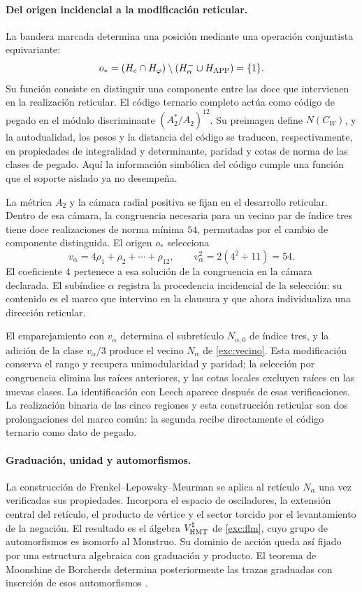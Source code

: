 \paragraph{Del origen incidencial a la modificación reticular.}
\label{inc-ampl-reticulo}
La bandera marcada determina una posición mediante una operación
conjuntista equivariante:
\[
 o_*=(H_e\cap H_\varphi)
       \setminus(H^-_\alpha\cup H_{\rm APP})=\{1\}.
\]
Su función consiste en distinguir una componente entre las doce que
intervienen en la realización reticular. El código ternario completo
actúa como código de pegado en el módulo discriminante
$(A_2^*/A_2)^{12}$. Su preimagen define $N(C_W)$, y la
autodualidad, los pesos y la distancia del código se traducen,
respectivamente, en propiedades de integralidad y determinante, paridad
y cotas de norma de las clases de pegado. Aquí la información simbólica
del código cumple una función que el soporte aislado ya no desempeña.

La métrica $A_2$ y la cámara radial positiva se fijan en el desarrollo
reticular. Dentro de esa cámara, la congruencia necesaria para un vecino
par de índice tres tiene doce realizaciones de norma mínima $54$,
permutadas por el cambio de componente distinguida. El origen $o_*$
selecciona
\[
 v_\alpha=4\rho_1+\rho_2+\cdots+\rho_{12},\qquad
 v_\alpha^2=2(4^2+11)=54.
\]
El coeficiente $4$ pertenece a esa solución de la congruencia en la
cámara declarada. El subíndice $\alpha$ registra la procedencia
incidencial de la selección: su contenido es el marco que intervino en
la clausura y que ahora individualiza una dirección reticular.

El emparejamiento con $v_\alpha$ determina el subretículo
$N_{\alpha,0}$ de índice tres, y la adición de la clase
$v_\alpha/3$ produce el vecino $N_\alpha$ de
\eqref{exc:vecino}. Esta modificación conserva el rango y recupera
unimodularidad y paridad; la selección por congruencia elimina las raíces
anteriores, y las cotas locales excluyen raíces en las nuevas clases.
La identificación con Leech aparece después de esas verificaciones. La
realización binaria de las cinco regiones y esta construcción reticular
son dos prolongaciones del marco común: la segunda recibe directamente
el código ternario como dato de pegado.

\paragraph{Graduación, unidad y automorfismos.}
\label{inc-ampl-automorfismos}
La construcción de Frenkel--Lepowsky--Meurman se aplica al retículo
$N_\alpha$ una vez verificadas sus propiedades. Incorpora el espacio
de osciladores, la extensión central del retículo, el producto de vértice
y el sector torcido por el levantamiento de la negación. El resultado es
el álgebra $V^\natural_{\rm HMT}$ de \eqref{exc:flm}, cuyo grupo
de automorfismos es isomorfo al Monstruo. Su dominio de acción queda así
fijado por una estructura algebraica con graduación y producto. El teorema
de Moonshine de Borcherds determina posteriormente las trazas graduadas
con inserción de esos automorfismos \cite{flm,borcherds}.

